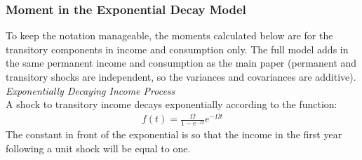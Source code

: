 

\subsubsection{Moment in the Exponential Decay Model} \label{exp_decay_moments_appendix}
To keep the notation manageable, the moments calculated below are for the transitory components in income and consumption only. The full model adds in the same permanent income and consumption as the main paper (permanent and transitory shocks are independent, so the variances and covariances are additive).\\

\textit{Exponentially Decaying Income Process}\\

A shock to transitory income decays exponentially according to the function:
\begin{align*}
f(t) = \frac{\Omega}{1-e^{-\Omega}} e^{-\Omega t}
\end{align*}
The constant in front of the exponential is so that the income in the first year following a unit shock will be equal to one.

